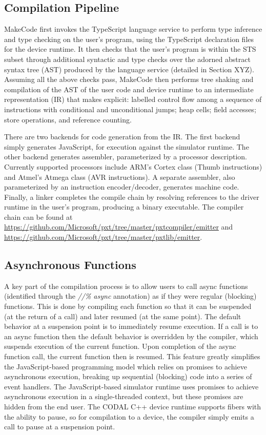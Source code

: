\subsection{Compilation Pipeline}

MakeCode first invokes the TypeScript language service to perform type inference and type checking on the 
user's program, using the TypeScript declaration files for the device runtime.   It then checks that the
user's program is within the STS subset through additional syntactic and type checks over the adorned
abstract syntax tree (AST) produced by the language service (detailed in Section XYZ).  Assuming all the
above checks pass, MakeCode then performs tree shaking and compilation of the AST of the user code and
device runtime to an intermediate representation (IR) that makes explicit: labelled control flow among a
sequence of instructions with conditional and unconditional jumps; heap cells; field accesses; store operations,
and reference counting.

There are two backends for code generation from the IR. The first backend simply generates JavaScript,
for execution against the simulator runtime.  The other backend generates assembler, parameterized by a
processor description.  Currently supported processors include ARM's Cortex class (Thumb instructions)
and Atmel's Atmega class (AVR instructions). A separate assembler, also parameterized by an instruction
encoder/decoder, generates machine code. Finally, a linker completes the compile chain by resolving
references to the driver runtime in the user's program, producing a binary executable. The compiler chain
can be found at \url{https://github.com/Microsoft/pxt/tree/master/pxtcompiler/emitter} and 
\url{https://github.com/Microsoft/pxt/tree/master/pxtlib/emitter}.

\subsection{Asynchronous Functions}

A key part of the compilation process is to allow users to call async functions (identified through
the \emph{//\% async} annotation) as if they were regular (blocking) functions.  This is done by
compiling each function so that it can be suspended (at the return of a call) and later resumed (at the same point). 
The default behavior at a suspension point is to immediately resume execution.  If a call is to an async function then
the default behavior is overridden by the compiler, which suspends execution of the current function. Upon completion
of the async function call, the current function then is resumed.    This feature greatly simplifies the JavaScript-based
programming model which relies on promises to achieve asynchronous execution, breaking up sequential (blocking) code into
a series of event handlers.  The JavaScript-based simulator runtime uses promises to achieve asynchronous execution in a
single-threaded context, but these promises are hidden from the end user.    The CODAL C++ device runtime supports fibers
with the ability to pause, so for compilation to a device, the compiler simply emits a call to pause at a suspension point. 

